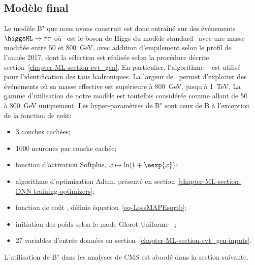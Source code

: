 \subsection{Modèle final}
Le modèle B" que nous avons construit
est donc entraîné sur des événements $\higgsML\to\tau\tau$
où \higgsML\ est le boson de Higgs du modèle standard \higgs\ avec une masse modifiée
entre \num{50} et \SI{800}{\GeV},
avec addition d'empilement selon le profil de l'année 2017,
dont la sélection est réalisée selon la procédure décrite section~\ref{chapter-ML-section-evt_gen}.
En particulier, l'algorithme \DEEPTAU~\cite{CMS-DP-2019-033} est utilisé pour l'identification des taus hadroniques.
La largeur de \higgsML\ permet d'exploiter des événements où sa masse effective est supérieure à \SI{800}{\GeV}, jusqu'à \SI{1}{\TeV}.
La gamme d'utilisation de notre modèle est toutefois considérée comme allant de \num{50} à \SI{800}{\GeV} uniquement.
Les hyper-paramètres de B" sont ceux de B à l'exception de la fonction de coût:
\begin{itemize}
\item 3 couches cachées;
\item \num{1000} neurones par couche cachée;
\item fonction d'activation Softplus, $x\mapsto\ln(1+\eexp{x})$;
\item algorithme d'optimisation Adam, présenté en section~\ref{chapter-ML-section-DNN-training-optimizers};
\item fonction de coût \LossMAPEsqrtb, définie équation~\eqref{eq-LossMAPEsqrtb};
\item initiation des poids selon le mode \og Glorot Uniforme \fg~\cite{glorot};
\item 27 variables d'entrée données en section~\ref{chapter-ML-section-evt_gen-inputs}.
\end{itemize}
\par
L'utilisation de B" dans les analyses de CMS est abordé dans la section suivante.